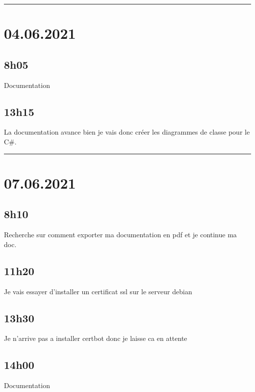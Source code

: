 \documentclass[a4paper,12pt,french]{sphinxmanual}
\begin{document}
\bigskip\hrule\bigskip



\section{04.06.2021}
\label{\detokenize{logbook:id188}}

\subsection{8h05}
\label{\detokenize{logbook:id189}}
\sphinxAtStartPar
Documentation


\subsection{13h15}
\label{\detokenize{logbook:id190}}
\sphinxAtStartPar
La documentation avance bien je vais donc créer les diagrammes de classe pour le C\#.


\bigskip\hrule\bigskip



\section{07.06.2021}
\label{\detokenize{logbook:id191}}

\subsection{8h10}
\label{\detokenize{logbook:id192}}
\sphinxAtStartPar
Recherche sur comment exporter ma documentation en pdf et je continue ma doc.


\subsection{11h20}
\label{\detokenize{logbook:id193}}
\sphinxAtStartPar
Je vais essayer d’installer un certificat ssl sur le serveur debian


\subsection{13h30}
\label{\detokenize{logbook:id194}}
\sphinxAtStartPar
Je n’arrive pas a installer certbot donc je laisse ca en attente


\subsection{14h00}
\label{\detokenize{logbook:id195}}
\sphinxAtStartPar
Documentation
\end{document}
